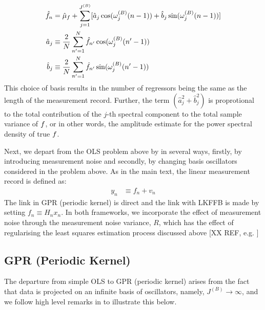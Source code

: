 \begin{align}
\hat{f}_n &= \hat{\mu}_f  + \sum_{j=1}^{J^{(B)}}  [\hat{a}_j \cos(\omega_j^{(B)} (n-1)) +  \hat{b}_j \sin(\omega_j^{(B)} (n-1)) ] \\
\hat{a}_j &\equiv \frac{2}{N} \sum_{n'=1}^{N} \hat{f}_{n'} \cos(\omega_j^{(B)}(n'-1)) \\
\hat{b}_j &\equiv \frac{2}{N} \sum_{n'=1}^{N} \hat{f}_{n'} \sin(\omega_j^{(B)}(n'-1))
\end{align}
This choice of basis results in the number of regressors being the same as the length of the measurement record. Further, the term $(\hat{a}_j^2 + \hat{b}_j^2)$ is proprotional to the total contribution of the $j$-th spectral component to the total sample variance of $f$, or in other words, the amplitude estimate for the power spectral density of true $f$.

Next, we depart from the OLS problem above by in several ways, firstly, by introducing measurement noise and secondly, by changing basis oscillators considered in the problem above. As in the main text, the linear measurement record is defined as:
\begin{align}
y_n &\equiv  f_n + v_n 
\end{align}
The link in GPR (periodic kernel) is direct and the link with LKFFB is made by setting $f_n \equiv H_nx_n$. In both frameworks, we incorporate the effect of measurement noise through the measurement noise variance, $R$, which has the effect of regularising the least squares estimation process discussed above {\color{red} [XX REF, e.g. \cite{west1996bayesian}]}

\subsection{GPR (Periodic Kernel)}\label{sec:ap_approxSP:GPRPKernel}

The departure from simple OLS to GPR (periodic kernel) arises from the fact that data is projected on an infinite basis of oscillators, namely, $J^{(B)} \to \infty$, and we follow high level remarks in \cite{solin2014explicit} to illustrate this below.

